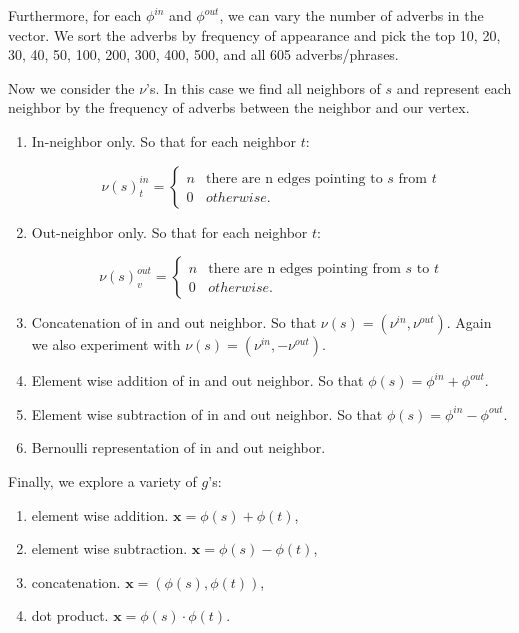 Furthermore, for each $\phi^{in}$ and $\phi^{out}$, we can vary the number of adverbs in the vector. We sort the adverbs by frequency of appearance and pick the top 10, 20, 30, 40, 50, 100, 200, 300, 400, 500, and all 605 adverbs/phrases. 

Now we consider the $\nu$'s. In this case we find all neighbors of $s$ and represent each neighbor by the frequency of adverbs between the neighbor and our vertex.

\begin{enumerate}
	\item In-neighbor only. So that for each neighbor $t$:

		\[   
		\nu(s)^{in}_t = \left\{
		\begin{array}{ll}
		      n & \text{there are n edges pointing to $s$ from $t$} \\
		      0 & otherwise.
		\end{array} 
		\right.
		\]

	\item Out-neighbor only. So that for each neighbor $t$:

		\[   
		\nu(s)^{out}_v = \left\{
		\begin{array}{ll}
		      n & \text{there are n edges pointing from $s$ to $t$} \\
		      0 & otherwise.
		\end{array} 
		\right. 
		\]

	\item Concatenation of in and out neighbor. So that $\nu(s) = (\nu^{in}, \nu^{out})$. Again we also experiment with $\nu(s) = (\nu^{in}, -\nu^{out})$.

	\item Element wise addition of in and out neighbor. So that $\phi(s) = \phi^{in} + \phi^{out}$.
	
	\item Element wise subtraction of in and out neighbor. So that $\phi(s) = \phi^{in} - \phi^{out}$.

	\item Bernoulli representation of in and out neighbor. 

\end{enumerate}



Finally, we explore a variety of $g$'s:

\begin{enumerate}
	\item element wise addition. $\pmb{x} = \phi(s) + \phi(t)$,
	\item element wise subtraction. $\pmb{x} = \phi(s) - \phi(t)$,
	\item concatenation. $\pmb{x} = (\phi(s), \phi(t))$,
	\item dot product. $\pmb{x} = \phi(s) \cdot \phi(t)$.
\end{enumerate}

